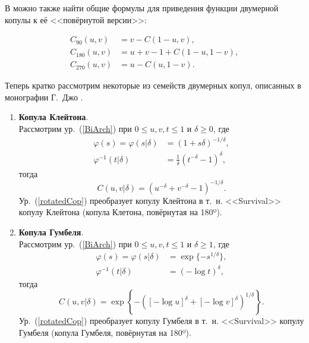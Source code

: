 В \cite{Brechmann2013} можно также найти общие формулы для приведения функции двумерной копулы к её <<повёрнутой версии>>:

\begin{equation} \label{rotatedCop}
\begin{aligned}
    C_{90}(u,v) &= v - C(1 - u, v), \\
    C_{180}(u,v) &= u + v - 1 + C(1 - u,1 - v), \\
    C_{270}(u, v) &= u - C(u, 1 - v).
\end{aligned}
\end{equation}

Теперь кратко рассмотрим некоторые из семейств двумерных копул, описанных в монографии Г.~Джо \cite{Joe1997}.

\begin{enumerate}
\item \textbf{Копула Клейтона}.\\
Рассмотрим ур.~(\ref{BiArch}) при $0 \le u,v,t \le 1$ и $\delta \ge 0$, где
\begin{equation}
\begin{aligned}
    \varphi (s) = \varphi(s| \delta) &= (1 + s \delta)^{-1/\delta}, \\ 
    \varphi^{-1}(t| \delta) &= \frac{1}{\delta} (t^{-\delta} - 1)^\delta,
\end{aligned} \nonumber 
\end{equation}
тогда
\begin{equation}
    C(u,v|\delta) = (u^{-\delta} + v^{-\delta} - 1)^{-1/\delta}. \nonumber
\end{equation}
Ур.~(\ref{rotatedCop}) преобразует копулу Клейтона в т.~н. <<Survival>> копулу Клейтона (копула Клетона, повёрнутая на 180º).

\item \textbf{Копула Гумбеля}.\\
Рассмотрим ур.~(\ref{BiArch}) при $0 \le u,v,t \le 1$ и $\delta \ge 1$, где
\begin{equation}
\begin{aligned}
    \varphi (s) = \varphi(s| \delta) &= \exp{\{-s^{1/\delta}\}}, \\ 
    \varphi^{-1}(t| \delta) &= (-\log{t})^\delta,
\end{aligned} \nonumber 
\end{equation}
тогда
\begin{equation}
    C(u,v|\delta) = \exp{\left\{-([-\log{u}]^\delta + [-\log{v}]^\delta)^{1/\delta}\right\}}. \nonumber
\end{equation}
Ур.~(\ref{rotatedCop}) преобразует копулу Гумбеля в т.~н. <<Survival>> копулу Гумбеля (копула Гумбеля, повёрнутая на 180º). 


\end{enumerate}
